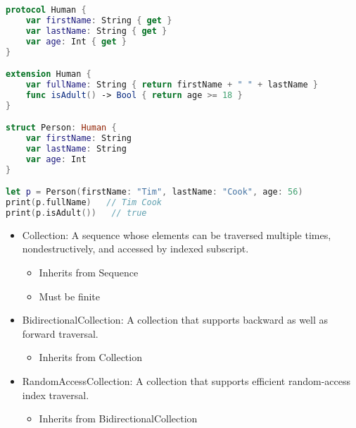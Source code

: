 \begin{breakbox}

\begin{lstlisting}[language=swift]
protocol Human {
    var firstName: String { get }
    var lastName: String { get }
    var age: Int { get }
}

extension Human {
    var fullName: String { return firstName + " " + lastName }
    func isAdult() -> Bool { return age >= 18 }
}

struct Person: Human {
    var firstName: String
    var lastName: String
    var age: Int
}

let p = Person(firstName: "Tim", lastName: "Cook", age: 56)
print(p.fullName)   // Tim Cook
print(p.isAdult())   // true
\end{lstlisting}
\end{breakbox}

\begin{breakbox}

\begin{itemize}
\tightlist
\item
  Collection: A sequence whose elements can be traversed multiple times,
  nondestructively, and accessed by indexed subscript.

  \begin{itemize}
  \tightlist
  \item
    Inherits from Sequence
  \item
    Must be finite
  \end{itemize}
\item
  BidirectionalCollection: A collection that supports backward as well
  as forward traversal.

  \begin{itemize}
  \tightlist
  \item
    Inherits from Collection
  \end{itemize}
\item
  RandomAccessCollection: A collection that supports efficient
  random-access index traversal.

  \begin{itemize}
  \tightlist
  \item
    Inherits from BidirectionalCollection
  \end{itemize}
\end{itemize}
\end{breakbox}
